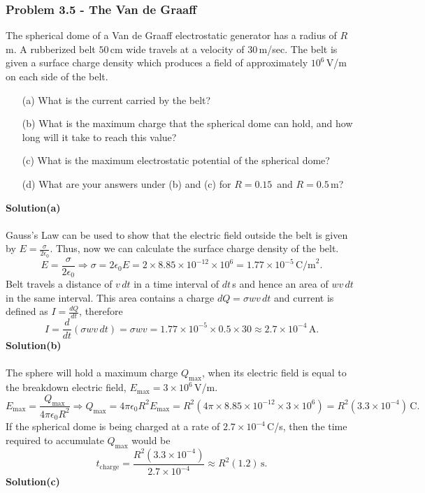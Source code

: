 \documentclass{article}
\begin{document}
\subsubsection*{Problem 3.5 - The Van de Graaff}
The spherical dome of a Van de Graaff electrostatic generator has a radius of $R\,$m. A rubberized belt $50\,$cm wide travels at a velocity of $30\,$m/sec. The belt is given a surface charge density which produces a field of approximately $10^6\,$V/m on each side of the belt.  
\begin{enumerate}
    \item[(a)]What is the current carried by the belt?
    \item[(b)]What is the maximum charge that the spherical dome can hold, and how long will it take to reach this value?
    \item[(c)]What is the maximum electrostatic potential of the spherical dome?
    \item[(d)]What are your answers under (b) and (c) for $R=0.15\,$ and $R=0.5\,$m?
\end{enumerate}
\textbf{Solution(a)}
\\
\\Gauss's Law can be used to show that the electric field outside the belt is given by $E=\frac{\sigma}{2\epsilon_0}$. Thus, now we can calculate the surface charge density of the belt.
\[E=\frac{\sigma}{2\epsilon_0}\Rightarrow\sigma=2\epsilon_0E=2\times8.85\times10^{-12}\times10^6=1.77\times10^{-5}\,\text{C/m}^2.\]
Belt travels a distance of $v\,dt$ in a time interval of $dt$\,s and hence an area of $wv\,dt$ in the same interval. This area contains a charge $dQ=\sigma wv\,dt$ and current is defined as $I=\frac{dQ}{dt}$, therefore
\[I=\frac{d}{dt}(\sigma wv\,dt)=\sigma wv=1.77\times10^{-5}\times0.5\times30\approx2.7\times10^{-4}\,\text{A}.\]
\textbf{Solution(b)}
\\
\\The sphere will hold a maximum charge $Q_{\text{max}}$, when its electric field is equal to the breakdown electric field, $E_{\text{max}}=3\times10^6\,$V/m.
\[E_{\text{max}}=\frac{Q_{\text{max}}}{4\pi\epsilon_0R^2}\Rightarrow Q_{\text{max}}=4\pi\epsilon_0R^2E_{\text{max}}=R^2\left(4\pi\times8.85\times10^{-12}\times3\times10^6\right)=R^2(3.3\times10^{-4})\,\text{C}.\]
If the spherical dome is being charged at a rate of $2.7\times10^{-4}\,$C/s, then the time required to accumulate $Q_{\text{max}}$ would be
\[t_{\text{charge}}=\frac{R^2(3.3\times10^{-4})}{2.7\times10^{-4}}\approx R^2(1.2)\,\text{s}.\]
\textbf{Solution(c)}
\\
\end{document}
